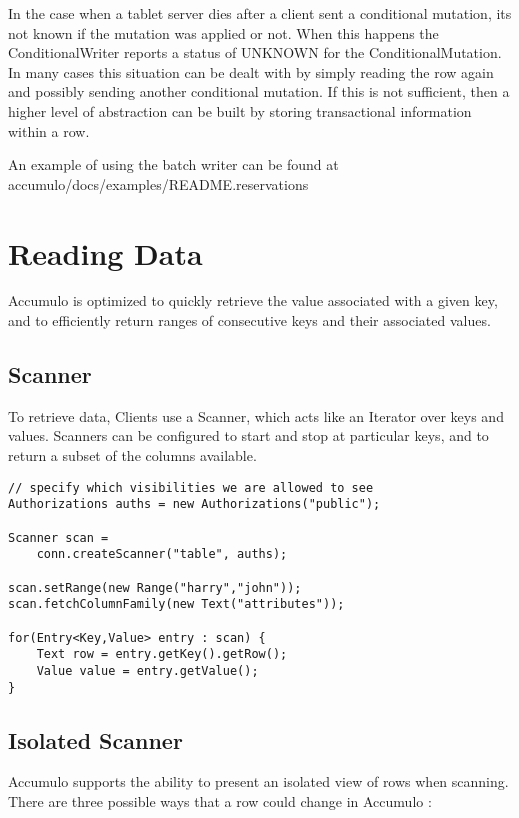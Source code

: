 In the case when a tablet server dies after a client sent a conditional
mutation, its not known if the mutation was applied or not.  When this happens
the ConditionalWriter reports a status of UNKNOWN for the ConditionalMutation.
In many cases this situation can be dealt with by simply reading the row again
and possibly sending another conditional mutation.  If this is not sufficient,
then a higher level of abstraction can be built by storing transactional
information within a row.
 
An example of using the batch writer can be found at\\
accumulo/docs/examples/README.reservations

\section{Reading Data}

Accumulo is optimized to quickly retrieve the value associated with a given key, and
to efficiently return ranges of consecutive keys and their associated values.

\subsection{Scanner}

To retrieve data, Clients use a Scanner, which acts like an Iterator over
keys and values. Scanners can be configured to start and stop at particular keys, and
to return a subset of the columns available.

\begingroup\fontsize{8pt}{8pt}\selectfont\begin{verbatim}
// specify which visibilities we are allowed to see
Authorizations auths = new Authorizations("public");

Scanner scan =
    conn.createScanner("table", auths);

scan.setRange(new Range("harry","john"));
scan.fetchColumnFamily(new Text("attributes"));

for(Entry<Key,Value> entry : scan) {
    Text row = entry.getKey().getRow();
    Value value = entry.getValue();
}
\end{verbatim}\endgroup

\subsection{Isolated Scanner}

Accumulo supports the ability to present an isolated view of rows when
scanning. There are three possible ways that a row could change in Accumulo :

